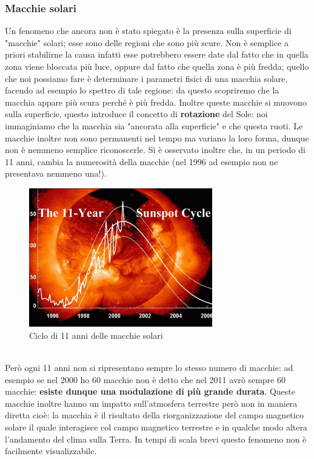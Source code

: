 \documentclass[a4paper,11pt]{article}
\begin{document}
    \subsubsection{Macchie solari}
        Un fenomeno che ancora non è stato spiegato è la presenza sulla superficie di "macchie" solari; esse sono delle regioni che sono più scure. Non è semplice a priori stabilirne la causa infatti esse potrebbero essere date dal fatto che in quella zona viene bloccata più luce, oppure dal fatto che quella zona è più fredda; quello che noi possiamo fare è determinare i parametri fisici di una macchia solare, facendo ad esempio lo spettro di tale regione: da questo scopriremo che la macchia appare più scura perché è più fredda.
        Inoltre queste macchie si muovono sulla superficie, questo introduce il concetto di \textbf{rotazione} del Sole: noi immaginiamo che la macchia sia "ancorata alla superficie" e che questa ruoti.
        Le macchie inoltre non sono permanenti nel tempo ma variano la loro forma, dunque non è nemmeno semplice riconoscerle.
        Si è osservato inoltre che, in un periodo di 11 anni, cambia la numerosità della macchie (nel 1996 ad esempio non ne presentava nemmeno una!).
        \\
        \begin{figure}[h!!]
            \centering
                \includegraphics[width=8cm]{2dic/Ciclo11Anni.jpg}
                \caption{Ciclo di 11 anni delle macchie solari}
            \label{fig:Ciclo11}
        \end{figure} 
        \\
        \newpage
        Però ogni 11 anni non si ripresentano sempre lo stesso numero di macchie: ad esempio se nel 2000 ho 60 macchie non è detto che nel 2011 avrò sempre 60 macchie: \textbf{esiste dunque una modulazione di più grande durata}.
        Queste macchie inoltre hanno un impatto sull'atmosfera terrestre però non in maniera diretta cioè: la macchia è il risultato della riorganizzazione del campo magnetico solare il quale interagisce col campo magnetico terrestre e in qualche modo altera l'andamento del clima sulla Terra. In tempi di scala brevi questo fenomeno non è facilmente visualizzabile. \\
\end{document}
